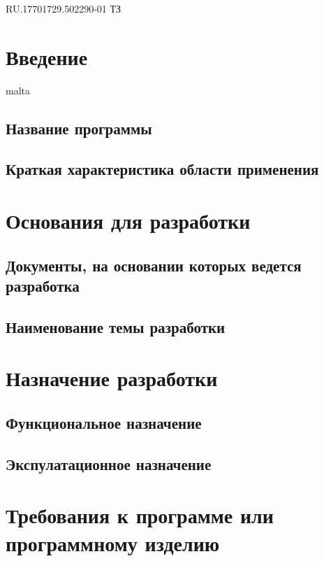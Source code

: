 \begin{uspd}{RU.17701729.502290-01 ТЗ}
\section{Введение}
malta
    \subsection{Название программы}

    
\subsection{Краткая характеристика области применения}

    

\section{Основания для разработки}

    \subsection{Документы, на основании которых ведется разработка}

    
\subsection{Наименование темы разработки}

    

\section{Назначение разработки}

    \subsection{Функциональное назначение}

    
\subsection{Экспулатационное назначение}

    

\section{Требования к программе или программному изделию}


\end{uspd}
